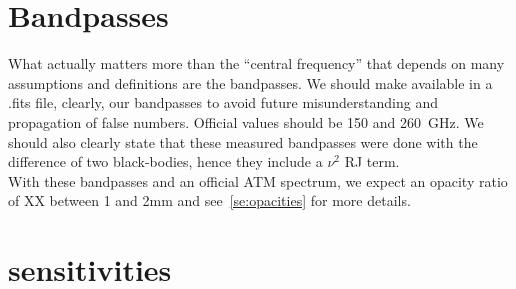 \documentclass[a4paper, 11pt]{article} %
\begin{document}
 

\section{Bandpasses}
What actually matters more than the ``central frequency'' that depends on many
assumptions and definitions are the bandpasses. We should make available in a
.fits file, clearly, our bandpasses to avoid future misunderstanding and propagation of
false numbers. Official values should be 150 and 260~GHz. We should also clearly
state that these measured bandpasses were done with the difference of two
black-bodies, hence they include a $\nu^2$ RJ term.\\

With these bandpasses and an official ATM spectrum, we expect an opacity ratio of
XX between 1 and 2mm and see~\ref{se:opacities} for more details.

\section{sensitivities}
\end{document}
